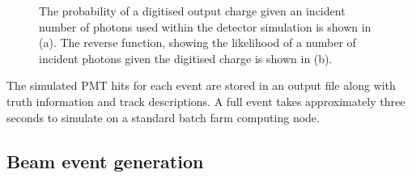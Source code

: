 \begin{figure} %
    \centering
    \quad
    \caption[Detector simulation PMT digitisation function]
    {The probability of a digitised output charge given an incident number of photons used within
    the detector simulation is shown in (a). The reverse function, showing the likelihood of a
    number of incident photons given the digitised charge is shown in (b).}
    \label{fig:digitisation}
\end{figure}

The simulated PMT hits for each event are stored in an output file along with truth information
and track descriptions. A full event takes approximately three seconds to simulate on a standard
batch farm computing node.

\subsection{Beam event generation} %
\label{sec:chips_monte_carlo_beam} %

